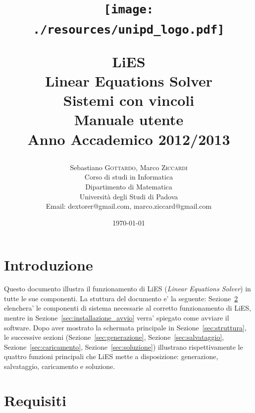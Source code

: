 \documentclass{article}
\title{
\begin{figure}[ht]
\begin{center}
\texttt{[image: ./resources/unipd\_logo.pdf]}
\end{center}
\end{figure}
LiES \\ Linear Equations Solver \\ Sistemi con vincoli \\\vspace{10mm} \textbf{Manuale utente}\\\vspace{0.4cm}
\Large{Anno Accademico 2012/2013}}
\author{Sebastiano \textsc{Gottardo}, Marco \textsc{Ziccardi}\\
Corso di studi in Informatica\\
Dipartimento di Matematica\\
Università degli Studi di Padova\\
Email: dextorer@gmail.com, marco.ziccard@gmail.com }
\date{\today} %
\begin{document}
\maketitle %



\newpage
\tableofcontents
\newpage


\section{Introduzione}
\label{sec:introduzione}

Questo documento illustra il funzionamento di LiES (\textit{Linear Equations Solver}) in tutte le sue componenti. La stuttura del documento e' la seguente: Sezione~\ref{sec:requisiti} elenchera' le componenti di sistema necessarie al corretto funzionamento di LiES, mentre in Sezione~\ref{sec:installazione_avvio} verra' spiegato come avviare il software. Dopo aver mostrato la schermata principale in Sezione~\ref{sec:struttura}, le successive sezioni (Sezione~\ref{sec:generazione}, Sezione~\ref{sec:salvataggio}, Sezione~\ref{sec:caricamento}, Sezione~\ref{sec:soluzione}) illustrano rispettivamente le quattro funzioni principali che LiES mette a disposizione: generazione, salvataggio, caricamento e soluzione.


\section{Requisiti}
\label{sec:requisiti}
\end{document}
